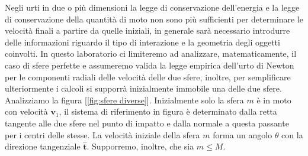 \documentclass[a4paper,10pt,oneside]{article}
\begin{document}
Negli urti in due o più dimensioni la legge di conservazione dell'energia e la legge di conservazione della quantità di moto non sono più sufficienti per determinare le velocità finali a partire da quelle iniziali, in generale sarà necessario introdurre delle informazioni riguardo il tipo di interazione e la geometria degli oggetti coinvolti. In questo laboratorio  ci limiteremo ad analizzare, matematicamente, il caso di sfere perfette e assumeremo valida la legge empirica dell'urto di Newton per le componenti radiali delle velocità delle due sfere, inoltre, per semplificare ulteriormente i calcoli si supporrà inizialmente immobile una delle due sfere. Analizziamo la figura [\ref{fig:sfere diverse}]. Inizialmente solo la sfera $m$ è in moto con velocità $\mathbf{v}_1$, il sistema di riferimento in figura è determinato dalla retta tangente alle due sfere nel punto di impatto e dalla normale a questa passante per i centri delle stesse. La velocità iniziale della sfera $m$ forma un angolo $\theta$ con la direzione tangenziale $\hat{\mathbf{t}}$. Supporremo, inoltre, che sia $m\leq M$.
\end{document}
